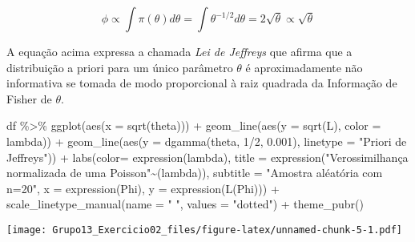 \documentclass[
]{article}
\newenvironment{Shaded}{\begin{snugshade}}{\end{snugshade}}
\newcommand{\AttributeTok}[1]{\textcolor[rgb]{0.77,0.63,0.00}{#1}}
\newcommand{\DecValTok}[1]{\textcolor[rgb]{0.00,0.00,0.81}{#1}}
\newcommand{\FloatTok}[1]{\textcolor[rgb]{0.00,0.00,0.81}{#1}}
\newcommand{\FunctionTok}[1]{\textcolor[rgb]{0.00,0.00,0.00}{#1}}
\newcommand{\NormalTok}[1]{#1}
\newcommand{\SpecialCharTok}[1]{\textcolor[rgb]{0.00,0.00,0.00}{#1}}
\newcommand{\StringTok}[1]{\textcolor[rgb]{0.31,0.60,0.02}{#1}}
\begin{document}
\[\phi \propto \int \pi(\theta) d\theta = \int \theta^{-1/2} d\theta = 2\sqrt\theta  \propto
 \sqrt\theta \]

A equação acima expressa a chamada \emph{Lei de Jeffreys} que afirma que
a distribuição a priori para um único parâmetro \(\theta\) é
aproximadamente não informativa se tomada de modo proporcional à raiz
quadrada da Informação de Fisher de \(\theta\).

\begin{Shaded}
\begin{Highlighting}[]
\NormalTok{df }\SpecialCharTok{\%\textgreater{}\%}  \FunctionTok{ggplot}\NormalTok{(}\FunctionTok{aes}\NormalTok{(}\AttributeTok{x =} \FunctionTok{sqrt}\NormalTok{(theta))) }\SpecialCharTok{+}
  \FunctionTok{geom\_line}\NormalTok{(}\FunctionTok{aes}\NormalTok{(}\AttributeTok{y =} \FunctionTok{sqrt}\NormalTok{(L), }\AttributeTok{color =}\NormalTok{ lambda)) }\SpecialCharTok{+}
  \FunctionTok{geom\_line}\NormalTok{(}\FunctionTok{aes}\NormalTok{(}\AttributeTok{y =} \FunctionTok{dgamma}\NormalTok{(theta, }\DecValTok{1}\SpecialCharTok{/}\DecValTok{2}\NormalTok{, }\FloatTok{0.001}\NormalTok{), }\AttributeTok{linetype =} \StringTok{"Priori de Jeffreys"}\NormalTok{)) }\SpecialCharTok{+}
  \FunctionTok{labs}\NormalTok{(}\AttributeTok{color=} \FunctionTok{expression}\NormalTok{(lambda), }
       \AttributeTok{title =} \FunctionTok{expression}\NormalTok{(}\StringTok{"Verossimilhança normalizada de uma Poisson"}\SpecialCharTok{\textasciitilde{}}\NormalTok{(lambda)),}
       \AttributeTok{subtitle =} \StringTok{"Amostra aléatória com n=20"}\NormalTok{,}
       \AttributeTok{x =} \FunctionTok{expression}\NormalTok{(Phi),}
       \AttributeTok{y =} \FunctionTok{expression}\NormalTok{(}\FunctionTok{L}\NormalTok{(Phi))) }\SpecialCharTok{+}
  \FunctionTok{scale\_linetype\_manual}\NormalTok{(}\AttributeTok{name =} \StringTok{" "}\NormalTok{, }\AttributeTok{values =} \StringTok{"dotted"}\NormalTok{) }\SpecialCharTok{+}
  \FunctionTok{theme\_pubr}\NormalTok{()}
\end{Highlighting}
\end{Shaded}

\texttt{[image: Grupo13\_Exercicio02\_files/figure-latex/unnamed-chunk-5-1.pdf]}
\end{document}
